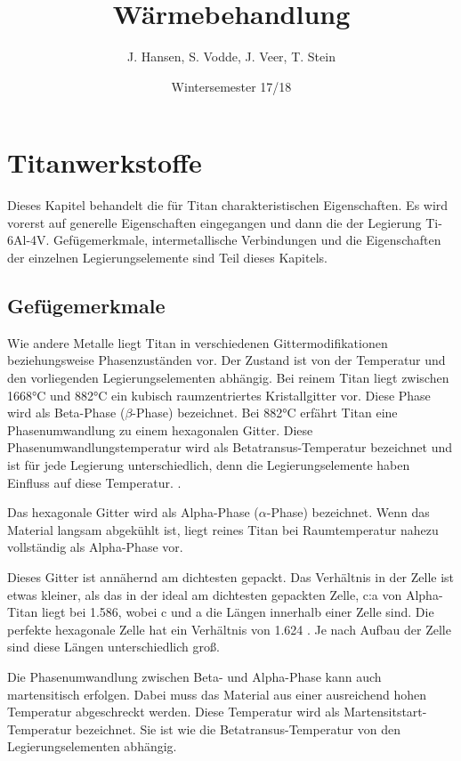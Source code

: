 \documentclass[a4paper, 11pt]{tubsreprt}
\title{Wärmebehandlung}
\date{Wintersemester 17/18}
\author{J. Hansen, S. Vodde,
 J. Veer, T. Stein}
\begin{document}
\maketitle
\tableofcontents
\chapter{Titanwerkstoffe}
Dieses Kapitel behandelt die für Titan charakteristischen Eigenschaften. Es wird vorerst auf generelle Eigenschaften eingegangen und dann die der Legierung Ti-6Al-4V. Gefügemerkmale, intermetallische Verbindungen und die Eigenschaften der einzelnen Legierungselemente sind Teil dieses Kapitels.
\section{Gefügemerkmale}\label{Abschnitt Gefügemerkmale}
Wie andere Metalle liegt Titan in verschiedenen Gittermodifikationen beziehungsweise Phasenzuständen vor. Der Zustand ist von der Temperatur und den vorliegenden Legierungselementen abhängig. Bei reinem Titan liegt zwischen 1668°C und 882°C ein kubisch raumzentriertes Kristallgitter vor. Diese Phase wird als Beta-Phase ($\beta$-Phase) bezeichnet. Bei 882°C erfährt Titan eine Phasenumwandlung zu einem hexagonalen Gitter. Diese Phasenumwandlungstemperatur wird als Betatransus-Temperatur bezeichnet und ist für jede Legierung unterschiedlich, denn die Legierungselemente haben Einfluss auf diese Temperatur. \cite{Luetjering2007}.

Das hexagonale Gitter wird als Alpha-Phase ($\alpha$-Phase) bezeichnet. Wenn das Material langsam abgekühlt ist, liegt reines Titan bei Raumtemperatur nahezu vollständig als Alpha-Phase vor. 

Dieses Gitter ist annähernd am dichtesten gepackt. Das Verhältnis in der Zelle ist etwas kleiner, als das in der ideal am dichtesten gepackten Zelle, c:a von Alpha-Titan liegt bei 1.586, wobei c und a die Längen innerhalb einer Zelle sind. Die perfekte hexagonale Zelle hat ein Verhältnis von 1.624 \cite{Luetjering2007}. Je nach Aufbau der Zelle sind diese Längen unterschiedlich groß.

Die Phasenumwandlung zwischen Beta- und Alpha-Phase kann auch martensitisch erfolgen. Dabei muss das Material aus einer ausreichend hohen Temperatur abgeschreckt werden. Diese Temperatur wird als Martensitstart-Temperatur bezeichnet. Sie ist wie die Betatransus-Temperatur von den Legierungselementen abhängig.  
\end{document}
